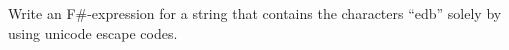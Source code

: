 Write an F\#-expression for a string that contains the characters ``edb'' solely by using unicode escape codes.